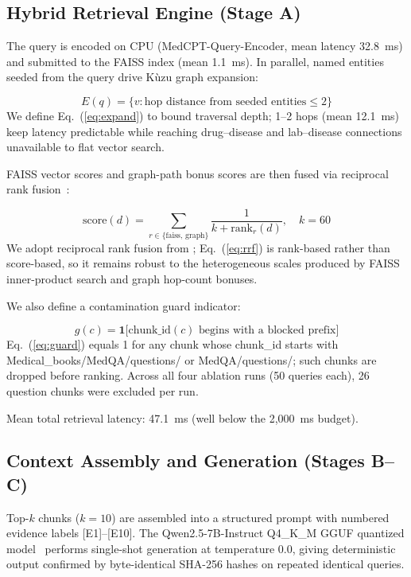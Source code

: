 \documentclass[conference]{IEEEtran}
\begin{document}
\subsection{Hybrid Retrieval Engine (Stage A)}

The query is encoded on CPU (MedCPT-Query-Encoder, mean latency 32.8~ms) and
submitted to the FAISS index (mean 1.1~ms). In parallel, named entities
seeded from the query drive K\`{u}zu graph expansion:

\begin{equation}
E(q) = \{ v : \text{hop distance from seeded entities} \leq 2 \}
\label{eq:expand}
\end{equation}
We define Eq.~(\ref{eq:expand}) to bound traversal depth; 1--2 hops (mean
12.1~ms) keep latency predictable while reaching drug--disease and
lab--disease connections unavailable to flat vector search.

FAISS vector scores and graph-path bonus scores are then fused via reciprocal
rank fusion~\cite{cormack2009rrf}:

\begin{equation}
\mathrm{score}(d) = \sum_{r \in \{\mathrm{faiss},\,\mathrm{graph}\}} \frac{1}{k + \mathrm{rank}_r(d)}, \quad k=60
\label{eq:rrf}
\end{equation}
We adopt reciprocal rank fusion from \cite{cormack2009rrf}; Eq.~(\ref{eq:rrf})
is rank-based rather than score-based, so it remains robust to the
heterogeneous scales produced by FAISS inner-product search and graph
hop-count bonuses.

We also define a contamination guard indicator:

\begin{equation}
g(c) = \mathbf{1}\bigl[\mathrm{chunk\_id}(c) \text{ begins with a blocked prefix}\bigr]
\label{eq:guard}
\end{equation}
Eq.~(\ref{eq:guard}) equals 1 for any chunk whose chunk\_id starts with
Medical\_books/MedQA/questions/ or MedQA/questions/; such chunks are dropped
before ranking. Across all four ablation runs (50 queries each), 26 question
chunks were excluded per run.

Mean total retrieval latency: 47.1~ms (well below the 2{,}000~ms budget).

\subsection{Context Assembly and Generation (Stages B--C)}

Top-$k$ chunks ($k=10$) are assembled into a structured prompt with numbered
evidence labels [E1]--[E10]. The Qwen2.5-7B-Instruct Q4\_K\_M GGUF quantized
model~\cite{qwen25} performs single-shot generation at temperature 0.0, giving
deterministic output confirmed by byte-identical SHA-256 hashes on repeated
identical queries.
\end{document}
